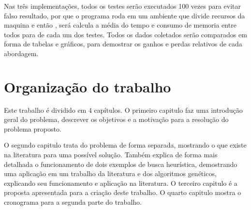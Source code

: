 Nas três implementações, todos os testes serão executados 100 vezes para evitar falso resultado, por que o programa roda em um ambiente que divide recursos da maquina e então , será calcula a média do tempo e consumo de memoria entre todos para de cada um dos testes. Todos os dados coletados serão comparados em forma de tabelas e gráficos, para demostrar os ganhos e perdas relativos de cada abordagem.

\section{Organização do trabalho}
Este trabalho é dividido em 4 capítulos. O primeiro capitulo faz uma introdução geral do problema, descrever os objetivos e a motivação para a resolução do problema proposto.

O segundo capitulo trata do problema de forma separada, mostrando o que existe na literatura para uma possível solução. Também explica de forma mais detalhada o funcionamento de dois exemplos de busca heurística, demostrando uma aplicação em um trabalho da literatura e dos algoritmos genéticos, explicando seu funcionamento e aplicação na literatura.
O terceiro capitulo é a proposta apresentada para a criação deste trabalho.
O quarto capitulo mostra o cronograma para a segunda parte do trabalho.
